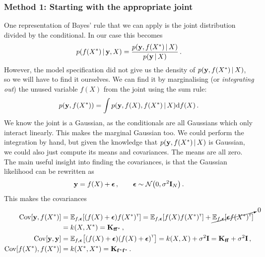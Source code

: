 \documentclass[a4paper]{article}
\theoremstyle{definition}
\begin{document}
\subsubsection{Method 1: Starting with the appropriate joint}
\label{sec:joint}
One representation of Bayes' rule that we can apply is the joint distribution divided by the conditional. In our case this becomes
\begin{align}
p(f(X^*)\,|\, \mathbf{y}, X) = \frac{p(\mathbf{y}, f(X^*)\,|\, X)}{p(\mathbf{y}\,|\, X)} \,.
\end{align}
However, the model specification did not give us the density of $p(\mathbf{y}, f(X^*)\,|\, X)$, so we will have to find it ourselves. We can find it by marginalising (or \emph{integrating out}) the unused variable $f(X)$ from the joint using the sum rule:
\begin{align}
p(\mathbf{y}, f(X^*)) = \int p(\mathbf{y}, f(X), f(X^*)\,|\, X) \mathrm{d}{f(X)} \,.
\end{align}
We know the joint is a Gaussian, as the conditionals are all Gaussians which only interact linearly. This makes the marginal Gaussian too. We could perform the integration by hand, but given the knowledge that $p(\mathbf{y}, f(X^*)\,|\, X)$ is Gaussian, we could also just compute its means and covariances. The means are all zero. The main useful insight into finding the covariances, is that the Gaussian likelihood can be rewritten as
\begin{align}
\vy = f(X) + \boldsymbol{\epsilon}\,, \qquad \boldsymbol{\epsilon} \sim \NormDist{0, \sigma^2\mathbf{I}_N} \,.
\end{align}
This makes the covariances
\begin{align}
\Cov\left[\vy, f(X^*)\right] &= \Exp{f, \vepsilon}{\left(f(X) + \vepsilon\right)f(X^*)\transpose} = \Exp{f, \vepsilon}{f(X)f(X^*)\transpose} + \cancelto{0}{\Exp{f,\vepsilon}{\vepsilon f(X^*)\transpose}} \\
&= k(X, X^*) = \Kfp \,, \\
\Cov[\vy, \vy] &= \Exp{f, \vepsilon}{\left(f(X) + \vepsilon\right)\left(f(X)+\vepsilon\right)\transpose} = k(X, X) + \sigma^2\mathbf{I} = \Kff + \sigma^2\mathbf{I} \,, \\
\Cov[f(X^*), f(X^*)] &= k(X^*, X^*) = \Kpp \,.
\end{align}
\end{document}
